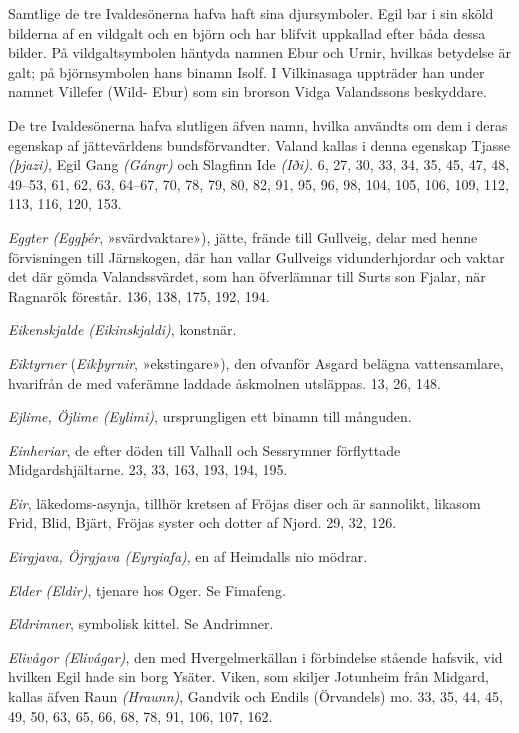 Samtlige de tre Ivaldesönerna hafva haft sina djursymboler. Egil bar i
sin sköld bilderna af en vildgalt och en björn och har blifvit uppkallad
efter båda dessa bilder. På vildgaltsymbolen häntyda namnen Ebur och
Urnir, hvilkas betydelse är galt; på björnsymbolen hans binamn Isolf. I
Vilkinasaga uppträder han under namnet Villefer (Wild- Ebur) som sin
brorson Vidga Valandssons beskyddare.

De tre Ivaldesönerna hafva slutligen äfven namn, hvilka användts om dem
i deras egenskap af jättevärldens bundsförvandter. Valand kallas i denna
egenskap Tjasse \emph{(þjazi)}, Egil Gang \emph{(Gángr)} och Slagfinn
Ide \emph{(Iði).} 6, 27, 30, 33, 34, 35, 45, 47, 48, 49--53, 61, 62, 63,
64--67, 70, 78, 79, 80, 82, 91, 95, 96, 98, 104, 105, 106, 109, 112,
113, 116, 120, 153.

\protect\hypertarget{lb1625905.xhtmlux5cux23start212}{}{}\protect\hypertarget{lb1625905.xhtmlux5cux23start212-a}{}{}\protect\hypertarget{lb1625905.xhtmlux5cux23start212-b}{}{}\protect\hypertarget{lb1625905.xhtmlux5cux23start212-c}{}{}\protect\hypertarget{lb1625905.xhtmlux5cux23start212-d}{}{}

\emph{Eggter (Eggþér}, »svärdvaktare»), jätte, frände till Gullveig,
delar med henne förvisningen till Järnskogen, där han vallar Gullveigs
vidunderhjordar och vaktar det där gömda Valandssvärdet, som han
öfverlämnar till Surts son Fjalar, när Ragnarök förestår. 136, 138, 175,
192, 194.

\emph{Eikenskjalde (Eikinskjaldi)}, konstnär.

\emph{Eiktyrner} (\emph{Eikþyrnir}, »ekstingare»), den ofvanför Asgard
belägna vattensamlare, hvarifrån de med vaferämne laddade åskmolnen
utsläppas. 13, 26, 148.

\emph{Ejlime, Öjlime (Eylimi)}, ursprungligen ett binamn till månguden.

\emph{Einheriar}, de efter döden till Valhall och Sessrymner förflyttade
Midgardshjältarne. 23, 33, 163, 193, 194, 195.

\emph{Eir}, läkedoms-asynja, tillhör kretsen af Fröjas diser och är
sannolikt, likasom Frid, Blid, Bjärt, Fröjas syster och dotter af Njord.
29, 32, 126.

\emph{Eirgjava, Öjrgjava (Eyrgiafa)}, en af Heimdalls nio mödrar.

\emph{Elder (Eldir)}, tjenare hos Oger. Se Fimafeng.

\emph{Eldrimner}, symbolisk kittel. Se Andrimner.

\emph{Elivågor (Elivágar)}, den med Hvergelmerkällan i förbindelse
stående hafsvik, vid hvilken Egil hade sin borg Ysäter. Viken, som
skiljer Jotunheim från Midgard, kallas äfven Raun \emph{(Hraunn)},
Gandvik och Endils (Örvandels) mo. 33, 35, 44, 45, 49, 50, 63, 65, 66,
68, 78, 91, 106, 107, 162.

